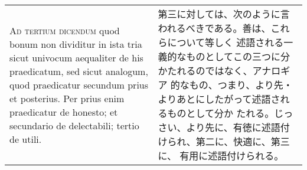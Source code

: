 \documentclass[10pt]{jsarticle} %
\begin{document}
\begin{longtable}{p{21em}p{21em}}
\\

{\scshape Ad tertium dicendum} quod bonum non dividitur in ista tria sicut
 univocum aequaliter de his praedicatum, sed sicut analogum, quod
 praedicatur secundum prius et posterius. Per prius enim praedicatur de
 honesto; et secundario de delectabili; tertio de utili.

&


第三に対しては、次のように言われるべきである。善は、これらについて等しく
 述語される一義的なものとしてこの三つに分かたれるのではなく、アナロギア
 的なもの、つまり、より先・よりあとにしたがって述語されるものとして分か
 たれる。じっさい、より先に、有徳に述語付けられ、第二に、快適に、第三に、
 有用に述語付けられる。



\end{longtable}
\end{document}
